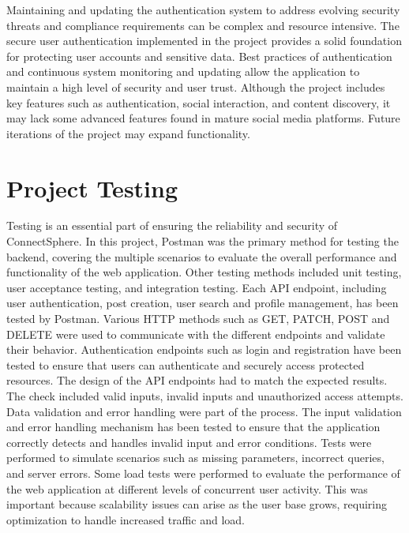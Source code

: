 Maintaining and updating the authentication system to address evolving security threats and compliance requirements can be complex and resource intensive. The secure user authentication implemented in the project provides a solid foundation for protecting user accounts and sensitive data. Best practices of authentication and continuous system monitoring and updating allow the application to maintain a high level of security and user trust. Although the project includes key features such as authentication, social interaction, and content discovery, it may lack some advanced features found in mature social media platforms. Future iterations of the project may expand functionality. 

\section{Project Testing}
Testing is an essential part of ensuring the reliability and security of ConnectSphere. In this project, Postman was the primary method for testing the backend, covering the multiple scenarios to evaluate the overall performance and functionality of the web application. Other testing methods included unit testing, user acceptance testing, and integration testing. Each API endpoint, including user authentication, post creation, user search and profile management, has been tested by Postman. Various HTTP methods such as GET, PATCH, POST and DELETE were used to communicate with the different endpoints and validate their behavior. Authentication endpoints such as login and registration have been tested to ensure that users can authenticate and securely access protected resources. The design of the API endpoints had to match the expected results. The check included valid inputs, invalid inputs and unauthorized access attempts. Data validation and error handling were part of the process. The input validation and error handling mechanism has been tested to ensure that the application correctly detects and handles invalid input and error conditions. Tests were performed to simulate scenarios such as missing parameters, incorrect queries, and server errors. Some load tests were performed to evaluate the performance of the web application at different levels of concurrent user activity. This was important because scalability issues can arise as the user base grows, requiring optimization to handle increased traffic and load. 

